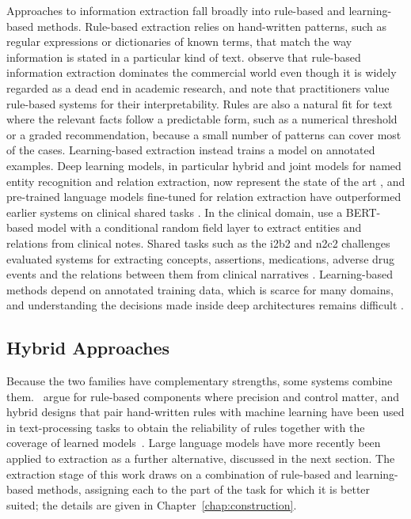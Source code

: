 Approaches to information extraction fall broadly into rule-based and
learning-based methods. Rule-based extraction relies on hand-written patterns,
such as regular expressions or dictionaries of known terms, that match the way
information is stated in a particular kind of text.\cite{chiticariu2013} observe that rule-based information extraction dominates
the commercial world even though it is widely regarded as a dead end in
academic research, and note that practitioners value rule-based systems for
their interpretability. Rules are also a natural fit for text where the
relevant facts follow a predictable form, such as a numerical threshold or a
graded recommendation, because a small number of patterns can cover most of the
cases.
Learning-based extraction instead trains a model on annotated examples. Deep
learning models, in particular hybrid and joint models for named entity
recognition and relation extraction, now represent the state of the art
\cite{nasar2021}, and pre-trained language models fine-tuned for relation
extraction have outperformed earlier systems on clinical shared tasks
\cite{wei2020}. In the clinical domain, \cite{harnoune2021} use a BERT-based
model with a conditional random field layer to extract entities and relations
from clinical notes. Shared tasks such as the i2b2 and n2c2 challenges evaluated
systems for extracting concepts, assertions, medications, adverse drug events
and the relations between them from clinical narratives
\cite{uzuner2011,henry2020}. Learning-based methods depend on annotated
training data, which is scarce for many domains, and understanding the
decisions made inside deep architectures remains difficult \cite{nasar2021}.

\subsection{Hybrid Approaches}
\label{sec:bg-ie-hybrid}

Because the two families have complementary strengths, some systems combine
them.~\cite{chiticariu2013} argue for rule-based components
where precision and control matter, and hybrid designs that pair hand-written
rules with machine learning have been used in text-processing tasks to obtain
the reliability of rules together with the coverage of learned
models~\cite{villena2011}. Large language models have more recently been applied
to extraction as a further alternative, discussed in the next section. The
extraction stage of this work draws on a combination of rule-based and
learning-based methods, assigning each to the part of the task for which it is
better suited; the details are given in Chapter~\ref{chap:construction}.

